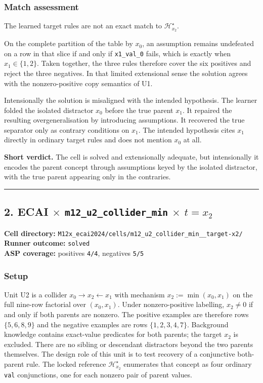 \documentclass[11pt]{article}
\begin{document}
\subsubsection{Match assessment}

The learned target rules are not an exact match to \(\mathcal{H}_{x_2}^\star\).

On the complete partition of the table by \(x_0\), an assumption remains undefeated on a row in that slice if and only if \texttt{x1\_val\_0} fails, which is exactly when \(x_1\in\{1,2\}\). Taken together, the three rules therefore cover the six positives and reject the three negatives. In that limited extensional sense the solution agrees with the nonzero-positive copy semantics of U1.

Intensionally the solution is misaligned with the intended hypothesis. The learner folded the isolated distractor \(x_0\) before the true parent \(x_1\). It repaired the resulting overgeneralisation by introducing assumptions. It recovered the true separator only as contrary conditions on \(x_1\). The intended hypothesis cites \(x_1\) directly in ordinary target rules and does not mention \(x_0\) at all.

\textbf{Short verdict.} The cell is solved and extensionally adequate, but intensionally it encodes the parent concept through assumptions keyed by the isolated distractor, with the true parent appearing only in the contraries.

\medskip\hrule\medskip

\subsection{\texorpdfstring{2. ECAI \(\times\) \texttt{m12\_u2\_collider\_min} \(\times\) \(t=x_2\)}{2. ECAI - m12-u2-collider-min - target x2}}

\textbf{Cell directory:} \texttt{M12x\_ecai2024/cells/m12\_u2\_collider\_min\_\_target-x2/}\\
\textbf{Runner outcome:} \texttt{solved}\\
\textbf{ASP coverage:} positives \texttt{4/4}, negatives \texttt{5/5}

\subsubsection{Setup}

Unit U2 is a collider \(x_0\to x_2\leftarrow x_1\) with mechanism \(x_2:=\min(x_0,x_1)\) on the full nine-row factorial over \((x_0,x_1)\). Under nonzero-positive labelling, \(x_2\neq 0\) if and only if both parents are nonzero. The positive examples are therefore rows \(\{5,6,8,9\}\) and the negative examples are rows \(\{1,2,3,4,7\}\). Background knowledge contains exact-value predicates for both parents; the target \(x_2\) is excluded. There are no sibling or descendant distractors beyond the two parents themselves. The design role of this unit is to test recovery of a conjunctive both-parent rule. The locked reference \(\mathcal{H}_{x_2}^\star\) enumerates that concept as four ordinary \texttt{val} conjunctions, one for each nonzero pair of parent values.
\end{document}
